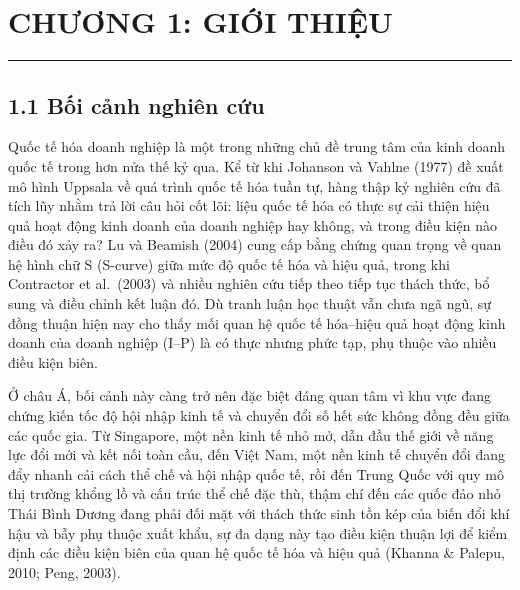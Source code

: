 \documentclass[
  a4paper,
  13pt]{extreport}
\author{}
\date{}
\begin{document}

\hypertarget{chux1b0ux1a1ng-1-giux1edbi-thiux1ec7u}{%
\chapter{CHƯƠNG 1: GIỚI
THIỆU}\label{chux1b0ux1a1ng-1-giux1edbi-thiux1ec7u}}

\begin{center}\rule{0.5\linewidth}{0.5pt}\end{center}

\hypertarget{bux1ed1i-cux1ea3nh-nghiuxean-cux1ee9u}{%
\section{1.1 Bối cảnh nghiên
cứu}\label{bux1ed1i-cux1ea3nh-nghiuxean-cux1ee9u}}

Quốc tế hóa doanh nghiệp là một trong những chủ đề trung tâm của kinh
doanh quốc tế trong hơn nửa thế kỷ qua. Kể từ khi Johanson và Vahlne
(1977) đề xuất mô hình Uppsala về quá trình quốc tế hóa tuần tự, hàng
thập kỷ nghiên cứu đã tích lũy nhằm trả lời câu hỏi cốt lõi: liệu quốc
tế hóa có thực sự cải thiện hiệu quả hoạt động kinh doanh của doanh
nghiệp hay không, và trong điều kiện nào điều đó xảy ra? Lu và Beamish
(2004) cung cấp bằng chứng quan trọng về quan hệ hình chữ S (S-curve)
giữa mức độ quốc tế hóa và hiệu quả, trong khi Contractor et al.~(2003)
và nhiều nghiên cứu tiếp theo tiếp tục thách thức, bổ sung và điều chỉnh
kết luận đó. Dù tranh luận học thuật vẫn chưa ngã ngũ, sự đồng thuận
hiện nay cho thấy mối quan hệ quốc tế hóa--hiệu quả hoạt động kinh doanh
của doanh nghiệp (I--P) là có thực nhưng phức tạp, phụ thuộc vào nhiều
điều kiện biên.

Ở châu Á, bối cảnh này càng trở nên đặc biệt đáng quan tâm vì khu vực
đang chứng kiến tốc độ hội nhập kinh tế và chuyển đổi số hết sức không
đồng đều giữa các quốc gia. Từ Singapore, một nền kinh tế nhỏ mở, dẫn
đầu thế giới về năng lực đổi mới và kết nối toàn cầu, đến Việt Nam, một
nền kinh tế chuyển đổi đang đẩy nhanh cải cách thể chế và hội nhập quốc
tế, rồi đến Trung Quốc với quy mô thị trường khổng lồ và cấu trúc thể
chế đặc thù, thậm chí đến các quốc đảo nhỏ Thái Bình Dương đang phải đối
mặt với thách thức sinh tồn kép của biến đổi khí hậu và bẫy phụ thuộc
xuất khẩu, sự đa dạng này tạo điều kiện thuận lợi để kiểm định các điều
kiện biên của quan hệ quốc tế hóa và hiệu quả (Khanna \& Palepu, 2010;
Peng, 2003).
\end{document}
